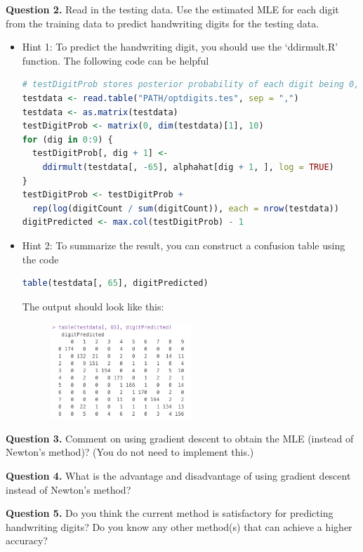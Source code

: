 \documentclass[twoside, letter]{article}
\begin{document}
{\bf Question 2.} Read in the testing data. Use the estimated MLE for each digit from the training data to predict handwriting digits for the testing data. 
\begin{itemize}
\item Hint 1: To predict the handwriting digit, you should use the `ddirmult.R' function. 
The following code can be helpful 
\begin{lstlisting}[language=R]
# testDigitProb stores posterior probability of each digit being 0,1,...,9
testdata <- read.table("PATH/optdigits.tes", sep = ",")
testdata <- as.matrix(testdata)
testDigitProb <- matrix(0, dim(testdata)[1], 10)
for (dig in 0:9) {
  testDigitProb[, dig + 1] <-
    ddirmult(testdata[, -65], alphahat[dig + 1, ], log = TRUE)
}
testDigitProb <- testDigitProb +
  rep(log(digitCount / sum(digitCount)), each = nrow(testdata))
digitPredicted <- max.col(testDigitProb) - 1
\end{lstlisting}

\item Hint 2: To summarize the result, you can construct a confusion table using the code
\begin{lstlisting}[language = R]
table(testdata[, 65], digitPredicted)
\end{lstlisting}
The output should look like this:
\begin{figure}[!h]
\centering
\includegraphics[width=0.5\textwidth]{confusion-table}
\end{figure}
\end{itemize}

{\bf Question 3.} Comment on using gradient descent to obtain the MLE (instead of Newton's method)? (You do not need to implement this.) 


{\bf Question 4.} What is the advantage and disadvantage of using gradient descent instead of Newton's method?

{\bf Question 5.} Do you think the current method is satisfactory for predicting handwriting digits? Do you know any other method(s) that can achieve a higher accuracy? 
\end{document}
